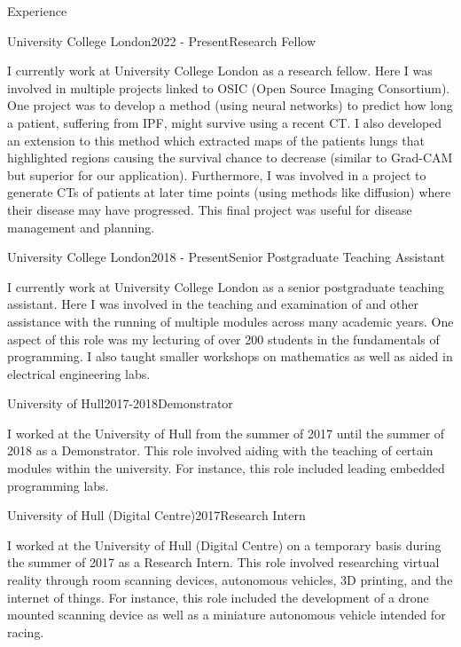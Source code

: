 \documentclass{cv}
\begin{document}
    \begin{rSection}{Experience}
        \begin{rSubsection}{University College London}{2022 - Present}{Research Fellow}{}
            \item I currently work at University College London as a research fellow. Here I was involved in multiple projects linked to OSIC (Open Source Imaging Consortium). One project was to develop a method (using neural networks) to predict how long a patient, suffering from IPF, might survive using a recent CT. I also developed an extension to this method which extracted maps of the patients lungs that highlighted regions causing the survival chance to decrease (similar to Grad-CAM but superior for our application). Furthermore, I was involved in a project to generate CTs of patients at later time points (using methods like diffusion) where their disease may have progressed. This final project was useful for disease management and planning.
        \end{rSubsection}
        
        \begin{rSubsection}{University College London}{2018 - Present}{Senior Postgraduate Teaching Assistant}{}
            \item I currently work at University College London as a senior postgraduate teaching assistant. Here I was involved in the teaching and examination of and other assistance with the running of multiple modules across many academic years. One aspect of this role was my lecturing of over 200 students in the fundamentals of programming. I also taught smaller workshops on mathematics as well as aided in electrical engineering labs.
        \end{rSubsection}
        
        \begin{rSubsection}{University of Hull}{2017-2018}{Demonstrator}{}
            \item I worked at the University of Hull from the summer of 2017 until the summer of 2018 as a Demonstrator. This role involved aiding with the teaching of certain modules within the university. For instance, this role included leading embedded programming labs.
        \end{rSubsection}
        
        \begin{rSubsection}{University of Hull (Digital Centre)}{2017}{Research Intern}{}
            \item I worked at the University of Hull (Digital Centre) on a temporary basis during the summer of 2017 as a Research Intern. This role involved researching virtual reality through room scanning devices, autonomous vehicles, 3D printing, and the internet of things. For instance, this role included the development of a drone mounted scanning device as well as a miniature autonomous vehicle intended for racing.
        \end{rSubsection}
        

\end{rSection}
\end{document}
